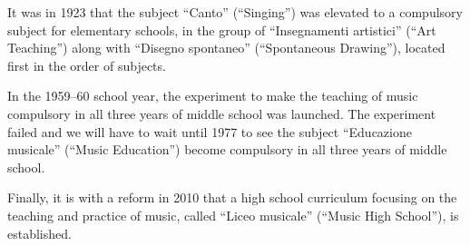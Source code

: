 It was in 1923 that the subject ``Canto'' (``Singing'') was elevated to a compulsory subject for elementary schools,
in the group of ``Insegnamenti artistici'' (``Art Teaching'') along with ``Disegno spontaneo'' (``Spontaneous Drawing''),
located first in the order of subjects.

In the 1959--60 school year, the experiment to make the teaching of music compulsory in all three years of middle school was launched.
The experiment failed and we will have to wait until 1977 to see the subject ``Educazione musicale'' (``Music Education'')
become compulsory in all three years of middle school.

Finally, it is with a reform in 2010 that a high school curriculum focusing on the teaching and practice of music,
called ``Liceo musicale'' (``Music High School''), is established.

